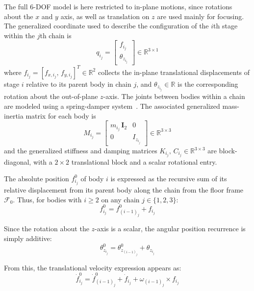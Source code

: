 The full 6-DOF model is here restricted to in-plane motions\cite{Al-Rawashdeh2023_Trajectories,Dong2023_SCurve}, since rotations about the $x$ and $y$ axis, as well as translation on $z$ are used mainly for focusing. The generalized coordinate used to describe the configuration of the $i$th stage within the $j$th chain is
\begin{equation}
    q_{i_j} = \begin{bmatrix} f_{i_j} \\ \theta_{z_{i_j}} \end{bmatrix} \in \mathbb{R}^{3\times1}
\end{equation}
where $f_{i_j} = [f_{x,i_j},\, f_{y,i_j}]^T \in \mathbb{R}^{2}$ collects the in-plane translational displacements of stage $i$ relative to its parent body in chain $j$, and $\theta_{z_{i_j}} \in \mathbb{R}$ is the corresponding rotation about the out-of-plane $z$-axis. The joints between bodies within a chain are modeled using a spring-damper system~\cite{Al-Rawashdeh2022_Caracterization}. The associated generalized mass-inertia matrix for each body is
\begin{equation}
    M_{i_j} = \begin{bmatrix} m_{i_j}\,\mathbf{I}_2 & 0 \\ 0 & I_{z_{i_j}} \end{bmatrix} \in \mathbb{R}^{3\times3}
\end{equation}
and the generalized stiffness and damping matrices $K_{i_j},\, C_{i_j} \in \mathbb{R}^{3\times3}$ are block-diagonal, with a $2\times2$ translational block and a scalar rotational entry.

The absolute position $f^{0}_{i_j}$ of body $i$ is expressed as the recursive sum of its relative displacement from its parent body along the chain from the floor frame $\mathcal{F}_{0}$. Thus, for bodies with $i \geq 2$ on any chain $j \in \{1,2,3\}$:
\begin{equation} \label{eq:frameref}
    f^{0}_{i_j} = f^{0}_{(i-1)_j} + f_{i_j}
\end{equation}

Since the rotation about the $z$-axis is a scalar, the angular position recurrence is simply additive:
\begin{equation} \label{eq:angleref}
    \theta^{0}_{z_{i_j}} = \theta^{0}_{z_{(i-1)_j}} + \theta_{z_{i_j}}
\end{equation}

From this, the translational velocity expression appears as:
\begin{equation}
    \dot{f}^{0}_{i_j} = \dot{f}^{0}_{(i-1)_j} + \dot{f}_{i_j} + \omega_{(i-1)_j}
    \times
    f_{i_j}
\end{equation}

